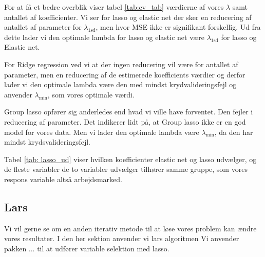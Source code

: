 
For at få et bedre overblik viser tabel  \ref{tab:cv_tab} værdierne af vores $\lambda$ samt antallet af koefficienter. 
Vi ser for lasso og elastic net der sker en reducering af antallet af parameter for $\lambda_{1\text{sd}}$, men hvor MSE ikke er signifikant forskellig. 
Ud fra dette lader vi den optimale lambda for lasso og elastic net være $\lambda_{1\text{sd}}$ for lasso og Elastic net. 

For Ridge regression ved vi at der ingen reducering vil være for antallet af parameter, men en reducering af de estimerede koefficients værdier og derfor lader vi den optimale lambda være den med mindst krydvalideringsfejl og anvender $\lambda_{\min}$, som vores optimale værdi. 

Group lasso opfører sig anderledes end hvad vi ville have forventet. 
Den fejler i reducering af parameter. 
Det indikerer lidt på, at Group lasso ikke er en god model for vores data. 
Men vi  lader den optimale lambda være $\lambda_{\min}$, da den har mindst krydsvalideringsfejl. 



Tabel \ref{tab: lasso_ud} viser hvilken koefficienter elastic net og lasso udvælger, og de fleste variabler de to variabler udvælger tilhører samme gruppe, som vores respons variable altså arbejdsmarked. 


\subsection{Lars}
Vi vil gerne se om en anden iterativ metode til at løse vores problem kan ændre vores resultater. 
I den her sektion anvender vi lars algoritmen 
Vi anvender pakken ... til at udfører variable selektion med lasso. 
